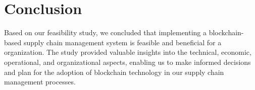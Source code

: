 \section{Conclusion}
\noindent Based on our feasibility study, we concluded that implementing a blockchain-based supply chain management system is feasible and beneficial for a organization. The study provided valuable insights into the technical, economic, operational, and organizational aspects, enabling us to make informed decisions and plan for the adoption of blockchain technology in our supply chain management processes.







